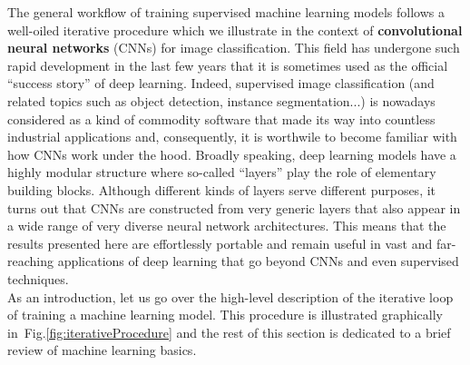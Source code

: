 \documentclass{article}
\begin{document}
The general workflow of training supervised machine learning models follows a well-oiled iterative procedure which we illustrate in the context of {\bf convolutional neural networks} (CNNs) for image classification.  This field has undergone such rapid development in the last few years that it is sometimes used as the official ``success story'' of deep learning.  Indeed, supervised image classification (and related topics such as object detection, instance segmentation...) is nowadays considered as a kind of commodity software that made its way into countless industrial applications and, consequently, it is worthwile to become familiar with how CNNs work under the hood.  Broadly speaking, deep learning models have a highly modular structure where so-called ``layers'' play the role of elementary building blocks.  Although different kinds of layers serve different purposes, it turns out that CNNs are constructed from very generic layers that also appear in a wide range of very diverse neural network architectures.  This means that the results presented here are effortlessly portable and remain useful in vast and far-reaching applications of deep learning that go beyond CNNs and even supervised techniques. \\

\noindent As an introduction, let us go over the high-level description of the iterative loop of training a machine learning model.  This procedure is illustrated graphically in~Fig.\ref{fig:iterativeProcedure} and the rest of this section is dedicated to a brief review of machine learning basics.

\newpage
\end{document}

